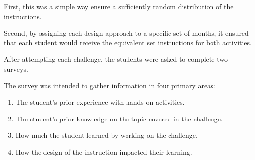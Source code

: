 First, this was a simple way ensure a sufficiently random distribution of the instructions. %







Second, by assigning each design approach to a specific set of months, it ensured that each student would receive the equivalent set instructions for both activities. 






















    After attempting each challenge, the students were asked to complete two surveys. %







The survey was intended to gather information in four primary areas:







    \begin{enumerate}







        \item The student's prior experience with hands-on activities.







        \item The student's prior knowledge on the topic covered in the challenge.







        \item How much the student learned by working on the challenge.







        \item How the design of the instruction impacted their learning. 







    \end{enumerate}








